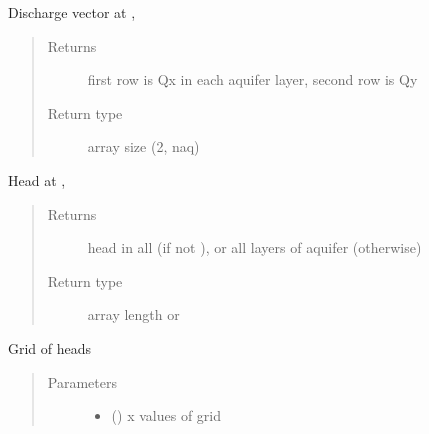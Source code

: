\documentclass[letterpaper,10pt,english]{sphinxmanual}
\begin{document}
\begin{fulllineitems}
\begin{fulllineitems}
\end{fulllineitems}


\begin{fulllineitems}
\label{\detokenize{models/model:timml.model.Model.disvec}}
Discharge vector at , 
\begin{quote}\begin{description}
\item[{Returns}] \leavevmode
{} \textendash{} first row is Qx in each aquifer layer, second row is Qy

\item[{Return type}] \leavevmode
array size (2, naq)

\end{description}\end{quote}

\end{fulllineitems}


\begin{fulllineitems}
\label{\detokenize{models/model:timml.model.Model.head}}
Head at , 
\begin{quote}\begin{description}
\item[{Returns}] \leavevmode
{} \textendash{} head in all  (if not ), or all layers of aquifer (otherwise)

\item[{Return type}] \leavevmode
array length  or 

\end{description}\end{quote}

\end{fulllineitems}


\begin{fulllineitems}
\label{\detokenize{models/model:timml.model.Model.headgrid}}
Grid of heads
\begin{quote}\begin{description}
\item[{Parameters}] \leavevmode\begin{itemize}
\item {} 
 () \textendash{} x values of grid


\end{itemize}
\end{description}
\end{quote}
\end{fulllineitems}
\end{fulllineitems}
\end{document}

